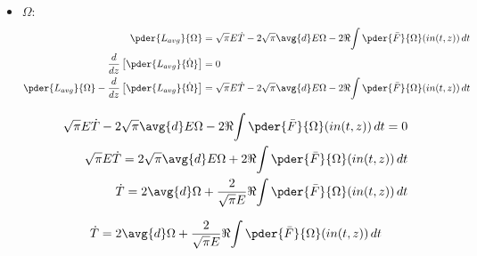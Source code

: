 \begin{itemize}

\item $\Omega$:
\begin{equation}
\begin{split}
\pder{L_{avg}}{\Omega} &= \sqrt{\pi} E \dot{T} - 2\sqrt{\pi}\avg{d} E \Omega - 2\Re{\int \pder{\bar{F}}{\Omega} (in(t,z))\,dt}\\
\frac{d}{dz}\left[\pder{L_{avg}}{\dot{\Omega}}\right] &= 0\\
\pder{L_{avg}}{\Omega} -\frac{d}{dz}\left[\pder{L_{avg}}{\dot{\Omega}}\right] &= \sqrt{\pi} E \dot{T} - 2\sqrt{\pi}\avg{d} E \Omega - 2\Re{\int \pder{\bar{F}}{\Omega} (in(t,z))\,dt}\\
\end{split}
\end{equation}

\begin{equation}
\begin{split}
\sqrt{\pi} E \dot{T} - 2\sqrt{\pi}\avg{d} E \Omega - 2\Re{\int \pder{\bar{F}}{\Omega} (in(t,z))\,dt} = 0\\
\sqrt{\pi} E \dot{T} =  2\sqrt{\pi}\avg{d} E \Omega + 2\Re{\int \pder{\bar{F}}{\Omega} (in(t,z))\,dt} \\
 \dot{T} =  2\avg{d} \Omega + \frac{2}{\sqrt{\pi} E}\Re{\int \pder{\bar{F}}{\Omega} (in(t,z))\,dt}\\
\end{split}
\end{equation}

\begin{equation}
\begin{split}
 \dot{T} =  2\avg{d} \Omega + \frac{2}{\sqrt{\pi} E}\Re{\int \pder{\bar{F}}{\Omega} (in(t,z))\,dt}\\
\end{split}
\end{equation}





\end{itemize}
